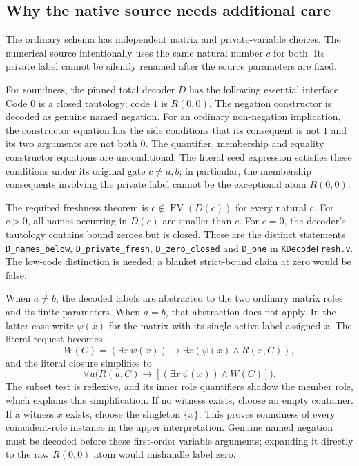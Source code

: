 \subsection{Why the native source needs additional care}

The ordinary schema has independent matrix and private-variable
choices.  The numerical source intentionally uses the same natural
number $c$ for both.  Its private label cannot be silently renamed
after the source parameters are fixed.

For soundness, the pinned total decoder $D$ has the following essential
interface.  Code $0$ is a closed tautology; code $1$ is $R(0,0)$.
The negation constructor is decoded as genuine named negation.  For an
ordinary non-negation implication, the constructor equation has the
side conditions that its consequent is not $1$ and its two arguments
are not both $0$.  The quantifier, membership and equality constructor
equations are unconditional.  The literal seed expression satisfies
these conditions under its original gate $c\ne a,b$; in particular,
the membership consequents involving the private label cannot be the
exceptional atom $R(0,0)$.

The required freshness theorem is
$c\notin\operatorname{FV}(D(c))$ for every natural $c$.
For $c>0$, all names occurring in $D(c)$ are smaller than $c$.
For $c=0$, the decoder's tautology contains bound zeroes but is closed.
These are the distinct statements \texttt{D\_names\_below},
\texttt{D\_private\_fresh}, \texttt{D\_zero\_closed} and
\texttt{D\_one} in \texttt{KDecodeFresh.v}.  The low-code distinction
is needed; a blanket strict-bound claim at zero would be false.

When $a\ne b$, the decoded labels are abstracted to the two ordinary
matrix roles and its finite parameters.  When $a=b$, that abstraction
does not apply.  In the latter case write $\psi(x)$ for the matrix
with its single active label assigned $x$.  The literal request becomes
\[
 W(C)=(\exists x\,\psi(x))\to
                 \exists x(\psi(x)\land R(x,C)),
\]
and the literal closure simplifies to
\[
 \forall u\bigl(R(u,C)\to[(\exists x\,\psi(x))\land W(C)]\bigr).
\]
The subset test is reflexive, and its inner role quantifiers shadow
the member role, which explains this simplification.  If no witness
exists, choose an empty container.  If a witness $x$ exists, choose
the singleton $\{x\}$.  This proves soundness of every coincident-role
instance in the upper interpretation.  Genuine named negation must be
decoded before these first-order variable arguments; expanding it
directly to the raw $R(0,0)$ atom would mishandle label zero.

